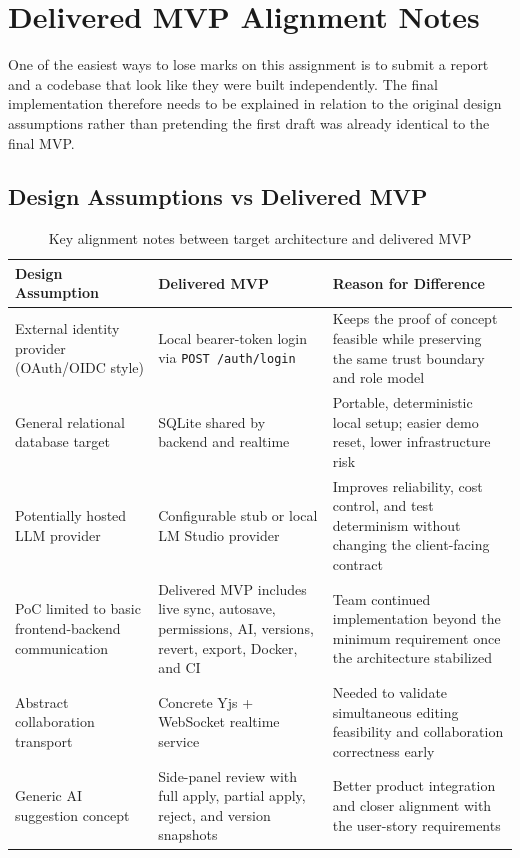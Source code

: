\chapter{Delivered MVP Alignment Notes}

One of the easiest ways to lose marks on this assignment is to submit a report and a codebase that look
like they were built independently. The final implementation therefore needs to be explained in relation
to the original design assumptions rather than pretending the first draft was already identical to the
final MVP.

\section{Design Assumptions vs Delivered MVP}

\begin{table}[H]
\centering
\caption{Key alignment notes between target architecture and delivered MVP}
\label{tab:mvp-alignment}
\begin{tabularx}{\textwidth}{p{4.1cm}p{4.8cm}X}
\toprule
\textbf{Design Assumption} & \textbf{Delivered MVP} & \textbf{Reason for Difference} \\
\midrule
External identity provider (OAuth/OIDC style) & Local bearer-token login via \texttt{POST /auth/login} & Keeps the proof of concept feasible while preserving the same trust boundary and role model \\
General relational database target & SQLite shared by backend and realtime & Portable, deterministic local setup; easier demo reset, lower infrastructure risk \\
Potentially hosted LLM provider & Configurable stub or local LM Studio provider & Improves reliability, cost control, and test determinism without changing the client-facing contract \\
PoC limited to basic frontend-backend communication & Delivered MVP includes live sync, autosave, permissions, AI, versions, revert, export, Docker, and CI & Team continued implementation beyond the minimum requirement once the architecture stabilized \\
Abstract collaboration transport & Concrete Yjs + WebSocket realtime service & Needed to validate simultaneous editing feasibility and collaboration correctness early \\
Generic AI suggestion concept & Side-panel review with full apply, partial apply, reject, and version snapshots & Better product integration and closer alignment with the user-story requirements \\
\bottomrule
\end{tabularx}
\end{table}

